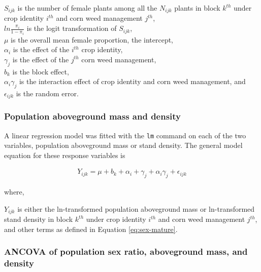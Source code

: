 \documentclass[
]{article}
\begin{document}
\(S_{ijk}\) is the number of female plants among all the \(N_{ijk}\) plants in block \(k^{th}\) under crop identity \(i^{th}\) and corn weed management \(j^{th}\),\\
\(ln \frac{\pi_i}{1-\pi_i}\) is the logit transformation of \(S_{ijk}\),\\
\(\mu\) is the overall mean female proportion, the intercept,\\
\(\alpha_i\) is the effect of the \(i^{th}\) crop identity,\\
\(\gamma_j\) is the effect of the \(j^{th}\) corn weed management,\\
\(b_k\) is the block effect,\\
\(\alpha_i \gamma_j\) is the interaction effect of crop identity and corn weed management, and\\
\(\epsilon_{ijk}\) is the random error.

\hypertarget{population-aboveground-mass-and-density-1}{%
\subsubsection*{Population aboveground mass and density}\label{population-aboveground-mass-and-density-1}}

A linear regression model was fitted with the \texttt{lm} command on each of the two variables, population aboveground mass or stand density. The general model equation for these response variables is

\begin{align}
Y_{ijk} = \mu + b_k + \alpha_i + \gamma_j +\alpha_i \gamma_j + \epsilon_{ijk} \label{eq:pop-mass-dens}
\end{align}

where,

\(Y_{ijk}\) is either the ln-transformed population aboveground mass or ln-transformed stand density in block \(k^{th}\) under crop identity \(i^{th}\) and corn weed management \(j^{th}\),\\
and other terms as defined in Equation \eqref{eq:sex-mature}.

\hypertarget{ancova-of-population-sex-ratio-aboveground-mass-and-density}{%
\subsubsection*{ANCOVA of population sex ratio, aboveground mass, and density}\label{ancova-of-population-sex-ratio-aboveground-mass-and-density}}
\end{document}

